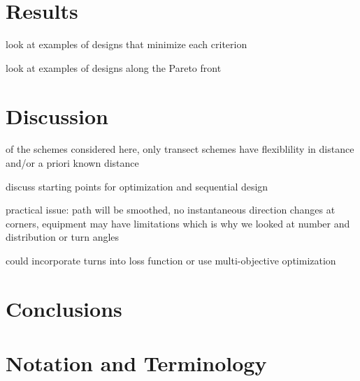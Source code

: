 \documentclass[review]{elsarticle}
\begin{document}
\section{Results}

look at examples of designs that minimize each criterion

look at examples of designs along the Pareto front


\section{Discussion}

of the schemes considered here, only transect schemes have flexiblility in
distance and/or a priori known distance

discuss starting points for optimization and sequential design

practical issue: path will be smoothed, no instantaneous direction changes at
corners, equipment may have limitations which is why we looked at number and
distribution or turn angles

could incorporate turns into loss function or use multi-objective
optimization~\citep{lark}


\section{Conclusions}


\appendix
\section{Notation and Terminology}
\end{document}
